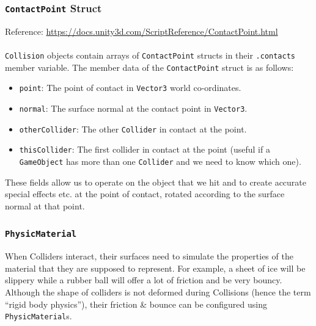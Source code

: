 \documentclass[a4paper,11pt]{article}
\begin{document}
\subsubsection{\texttt{ContactPoint} Struct}
Reference: \url{https://docs.unity3d.com/ScriptReference/ContactPoint.html}
\\\\
\verb|Collision| objects contain arrays of \verb|ContactPoint| structs in their \verb|.contacts| member variable.
The member data of the \verb|ContactPoint| struct is as follows:
\begin{itemize}
    \item   \verb|point|: The point of contact in \verb|Vector3| world co-ordinates.
    \item   \verb|normal|: The surface normal at the contact point in \verb|Vector3|.
    \item   \verb|otherCollider|: The other \verb|Collider| in contact at the point.
    \item   \verb|thisCollider|: The first collider in contact at the point (useful if a \verb|GameObject| has 
            more than one \verb|Collider| and we need to know which one).
\end{itemize}

These fields allow us to operate on the object that we hit and to create accurate special effects etc. at the 
point of contact, rotated according to the surface normal at that point.

\subsubsection{\texttt{PhysicMaterial}}
When Colliders interact, their surfaces need to simulate the properties of the material that they are supposed to
represent.
For example, a sheet of ice will be slippery while a rubber ball will offer a lot of friction and be very bouncy.
Although the shape of colliders is not deformed during Collisions (hence the term ``rigid body physics''), their
friction \& bounce can be configured using \verb|PhysicMaterial|s.
\end{document}
